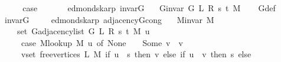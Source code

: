 \begin{isabellebody}
\ \ \isamarkupfalse%
\ \isamarkupfalse%
\ {\isacharquery}{\kern0pt}case\isanewline
\ \ \ \ \isacommand{{\isachardot}{\kern0pt}}\isamarkupfalse%
\isanewline
{}\isamarkupfalse%
%
\endisatagproof
{\isafoldproof}%
%
\isadelimproof
\isanewline
%
\endisadelimproof
%
\isadeliminvisible
\isanewline
%
\endisadeliminvisible
%
\isataginvisible
{}\isamarkupfalse%
\ {\isacharparenleft}{\kern0pt}\ edmonds{\isacharunderscore}{\kern0pt}karp{\isacharparenright}{\kern0pt}\ invar{\isacharunderscore}{\kern0pt}G{}{\isacharcolon}{\kern0pt}\isanewline
\ \ \ {\isachardoublequoteopen}G{\isachardot}{\kern0pt}invar\ {\isacharparenleft}{\kern0pt}G{}\ L\ R\ s\ t\ M{\isacharparenright}{\kern0pt}{\isachardoublequoteclose}%
\endisataginvisible
{\isafoldinvisible}%
%
\isadeliminvisible
\isanewline
%
\endisadeliminvisible
%
\isadelimproof
\ \ %
\endisadelimproof
%
\isatagproof
{}\isamarkupfalse%
\ G{}{\isacharunderscore}{\kern0pt}def\isanewline
\ \ \isamarkupfalse%
\ invar{\isacharunderscore}{\kern0pt}G{}{\isacharunderscore}{\kern0pt}{}\isanewline
\ \ \isacommand{{\isachardot}{\kern0pt}}\isamarkupfalse%
%
\endisatagproof
{\isafoldproof}%
%
\isadelimproof
\isanewline
%
\endisadelimproof
%
\isadeliminvisible
\isanewline
%
\endisadeliminvisible
%
\isataginvisible
{}\isamarkupfalse%
\ {\isacharparenleft}{\kern0pt}\ edmonds{\isacharunderscore}{\kern0pt}karp{\isacharparenright}{\kern0pt}\ adjacency{\isacharunderscore}{\kern0pt}G{}{\isacharunderscore}{\kern0pt}cong{\isacharcolon}{\kern0pt}\isanewline
\ \ \ {\isachardoublequoteopen}M{\isachardot}{\kern0pt}invar\ M{\isachardoublequoteclose}\isanewline
\ \ \isanewline
\ \ \ \ {\isachardoublequoteopen}set\ {\isacharparenleft}{\kern0pt}G{\isachardot}{\kern0pt}adjacency{\isacharunderscore}{\kern0pt}list\ {\isacharparenleft}{\kern0pt}G{}\ L\ R\ s\ t\ M{\isacharparenright}{\kern0pt}\ u{\isacharparenright}{\kern0pt}\ {\isacharequal}{\kern0pt}\isanewline
\ \ \ \ \ {\isacharparenleft}{\kern0pt}case\ M{\isacharunderscore}{\kern0pt}lookup\ M\ u\ of\ None\ {\isasymRightarrow}\ {\isacharbraceleft}{\kern0pt}{\isacharbraceright}{\kern0pt}\ {\isacharbar}{\kern0pt}\ Some\ v\ {\isasymRightarrow}\ {\isacharbraceleft}{\kern0pt}v{\isacharbraceright}{\kern0pt}{\isacharparenright}{\kern0pt}\ {\isasymunion}\isanewline
\ \ \ \ \ {\isacharparenleft}{\kern0pt}{\isasymUnion}v{\isasymin}set\ {\isacharparenleft}{\kern0pt}free{\isacharunderscore}{\kern0pt}vertices\ L\ M{\isacharparenright}{\kern0pt}{\isachardot}{\kern0pt}\ if\ u\ {\isacharequal}{\kern0pt}\ s\ then\ {\isacharbraceleft}{\kern0pt}v{\isacharbraceright}{\kern0pt}\ else\ if\ u\ {\isacharequal}{\kern0pt}\ v\ then\ {\isacharbraceleft}{\kern0pt}s{\isacharbraceright}{\kern0pt}\ else\ {\isacharbraceleft}{\kern0pt}{\isacharbraceright}{\kern0pt}{\isacharparenright}{\kern0pt}\ {\isasymunion}\isanewline

\end{isabellebody}

